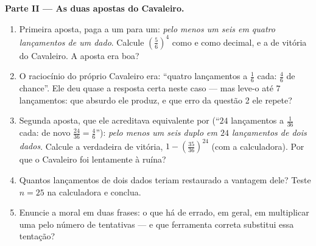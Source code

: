 \begin{problem}
\medskip
\noindent\textbf{Parte II --- As duas apostas do Cavaleiro.}
\begin{enumerate}[resume]
  \item Primeira aposta, paga a um para um: \emph{pelo menos um seis em
        quatro lançamentos de um dado}. Calcule
        $\left(\frac56\right)^4$ como  e como decimal, e a
         de vitória do Cavaleiro. A aposta era boa?
  \item O raciocínio do próprio Cavaleiro era: ``quatro lançamentos a
        $\frac16$ cada: $\frac46$ de chance''. Ele deu quase a resposta
        certa neste caso --- mas leve-o até $7$ lançamentos: que
        absurdo ele produz, e que erro da questão 2 ele repete?
  \item Segunda aposta, que ele acreditava equivalente por
         (``$24$ lançamentos a $\frac1{36}$ cada: de
        novo $\frac{24}{36} = \frac46$''): \emph{pelo menos um seis
        duplo em $24$ lançamentos de dois dados}. Calcule a
         verdadeira de vitória,
        $1 - \left(\frac{35}{36}\right)^{24}$ (com a calculadora). Por
        que o Cavaleiro foi lentamente à ruína?
  \item Quantos lançamentos de dois dados teriam restaurado a vantagem
        dele? Teste $n = 25$ na calculadora e conclua.
  \item Enuncie a moral em duas frases: o que há de errado, em geral,
        em multiplicar uma  pelo número de tentativas ---
        e que ferramenta correta substitui essa tentação?
\end{enumerate}


\end{problem}
